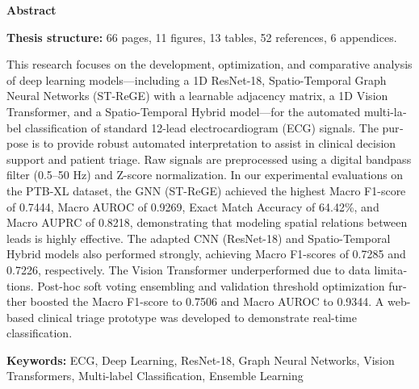 \documentclass[12pt,a4paper]{article}
\begin{document}
\begin{otherlanguage}{english}
\begin{center}
    \large\textbf{Abstract}
\end{center}
\vspace{0.3cm}

\noindent \textbf{Thesis structure:} 66 pages, 11 figures, 13 tables, 52 references, 6 appendices.
\vspace{0.3cm}

This research focuses on the development, optimization, and comparative analysis of deep learning models---including a 1D ResNet-18, Spatio-Temporal Graph Neural Networks (ST-ReGE) with a learnable adjacency matrix, a 1D Vision Transformer, and a Spatio-Temporal Hybrid model---for the automated multi-label classification of standard 12-lead electrocardiogram (ECG) signals. The purpose is to provide robust automated interpretation to assist in clinical decision support and patient triage. Raw signals are preprocessed using a digital bandpass filter (0.5--50 Hz) and Z-score normalization. In our experimental evaluations on the PTB-XL dataset, the GNN (ST-ReGE) achieved the highest Macro F1-score of 0.7444, Macro AUROC of 0.9269, Exact Match Accuracy of 64.42\%, and Macro AUPRC of 0.8218, demonstrating that modeling spatial relations between leads is highly effective. The adapted CNN (ResNet-18) and Spatio-Temporal Hybrid models also performed strongly, achieving Macro F1-scores of 0.7285 and 0.7226, respectively. The Vision Transformer underperformed due to data limitations. Post-hoc soft voting ensembling and validation threshold optimization further boosted the Macro F1-score to 0.7506 and Macro AUROC to 0.9344. A web-based clinical triage prototype was developed to demonstrate real-time classification.

\vspace{0.8cm}
\noindent\textbf{Keywords:} ECG, Deep Learning, ResNet-18, Graph Neural Networks, Vision Transformers, Multi-label Classification, Ensemble Learning
\end{otherlanguage}

\clearpage
\end{document}
